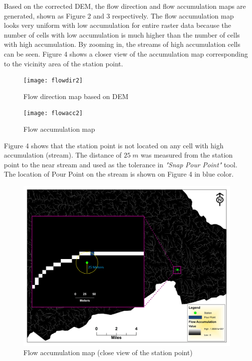 \documentclass[letterpaper,12pt]{article}
\begin{document}
\begin{enumerate}
	
	Based on the corrected DEM, the flow direction and flow accumulation maps are generated, shown as Figure 2 and 3 respectively. The flow accumulation map looks very uniform with low accumulation for entire raster data because the number of cells with low accumulation is much higher than the number of cells with high accumulation. By zooming in, the streams of high accumulation cells can be seen. Figure 4 shows a closer view of the accumulation map corresponding to the vicinity area of the station point.
	
		\begin{figure}[H]
			\begin{center}
				\texttt{[image: flowdir2]}
			\end{center}
			\caption{Flow direction map based on DEM}\label{flow_dir}
		\end{figure}

	\begin{figure}[H]
		\begin{center}
			\texttt{[image: flowacc2]}
		\end{center}
	\caption{Flow accumulation map}\label{flow_acc_zoom}
	\end{figure}

	Figure 4 shows that the station point is not located on any cell with high accumulation (stream). The distance of $25\;m$ was measured from the station point to the near stream and used as the tolerance in \emph{"Snap Pour Point"} tool. The location of Pour Point on the stream is shown on Figure 4 in blue color.

	\begin{figure}[H]
		\begin{center}
			\includegraphics[width=16cm]{snappoint2}
		\end{center}
		\caption{Flow accumulation map (close view of the station point)}
	\end{figure}~



\end{enumerate}
\end{document}
